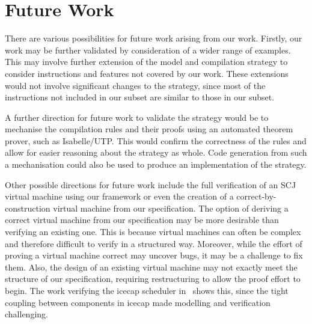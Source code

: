 
\section{Future Work}
\label{future-work-section}

There are various possibilities for future work arising from our work.
Firstly, our work may be further validated by consideration of a wider
range of examples.
This may involve further extension of the model and compilation
strategy to consider instructions and features not covered by our
work.
These extensions would not involve significant changes to the
strategy, since most of the instructions not included in our subset
are similar to those in our subset.

A further direction for future work to validate the strategy would be
to mechanise the compilation rules and their proofs using an automated
theorem prover, such as Isabelle/UTP.
This would confirm the correctness of the rules and allow for easier
reasoning about the strategy as whole.
Code generation from such a mechanisation could also be used to
produce an implementation of the strategy.


Other possible directions for future work include the full
verification of an SCJ virtual machine using our framework or even the
creation of a correct-by-construction virtual machine from our
specification.
The option of deriving a correct virtual machine from our
specification may be more desirable than verifying an existing one.
This is because virtual machines can often be complex and therefore
difficult to verify in a structured way.
Moreover, while the effort of proving a virtual machine correct may
uncover bugs, it may be a challenge to fix them.
Also, the design of an existing virtual machine may not exactly meet
the structure of our specification, requiring restructuring to allow
the proof effort to begin.
The work verifying the icecap scheduler in~\cite{freitas2016} shows
this, since the tight coupling between components in icecap made
modelling and verification challenging.

